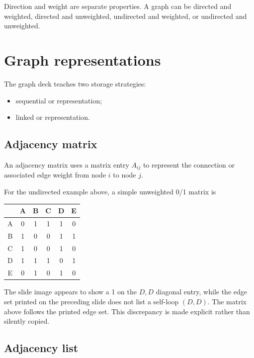 \begin{keyidea}
Direction and weight are separate properties. A graph can be directed and weighted, directed and unweighted, undirected and weighted, or undirected and unweighted.
\end{keyidea}

\section{Graph representations}

The graph deck teaches two storage strategies:

\begin{itemize}
  \item sequential or  representation;
  \item linked or  representation.
\end{itemize}

\subsection{Adjacency matrix}

An adjacency matrix uses a matrix entry $A_{ij}$ to represent the connection or associated edge weight from node $i$ to node $j$.

For the undirected example above, a simple unweighted 0/1 matrix is

\begin{mltable}
\begin{tabular}{c|ccccc}
 & A & B & C & D & E \\
\hline
A & 0 & 1 & 1 & 1 & 0 \\
B & 1 & 0 & 0 & 1 & 1 \\
C & 1 & 0 & 0 & 1 & 0 \\
D & 1 & 1 & 1 & 0 & 1 \\
E & 0 & 1 & 0 & 1 & 0 \\
\end{tabular}
\end{mltable}

\begin{clarification}
The slide image appears to show a 1 on the $D,D$ diagonal entry, while the edge set printed on the preceding slide does not list a self-loop $(D,D)$. The matrix above follows the printed edge set. This discrepancy is made explicit rather than silently copied.
\end{clarification}

\subsection{Adjacency list}

